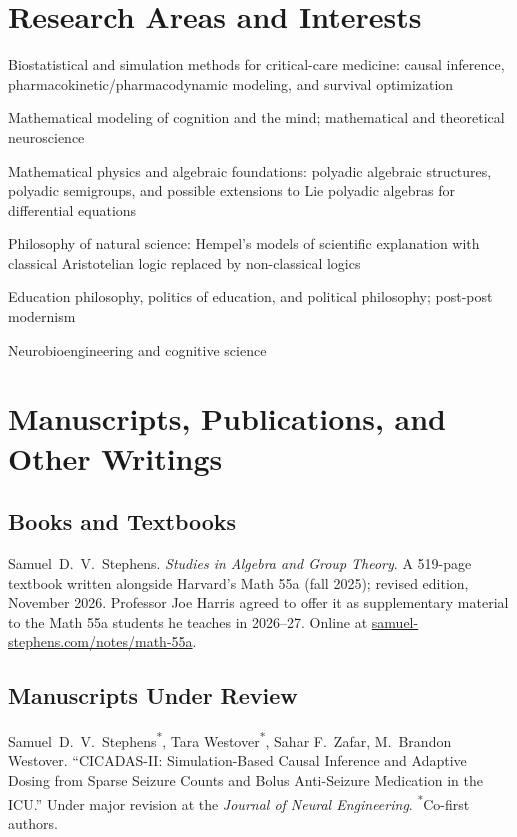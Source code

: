 \documentclass[11pt,letterpaper]{report} %
\newcommand{\listitemspace}{0.25em}
\renewenvironment{itemize}
{\begin{list}{}{\setlength{\leftmargin}{0em}
                \setlength{\parskip}{0em}
                \setlength{\itemsep}{\listitemspace}
                \setlength{\parsep}{\listitemspace}}}
{\end{list}}
\begin{document}
    \section*{Research Areas and Interests}
    \begin{itemize}
        \item Biostatistical and simulation methods for critical-care medicine: causal inference, pharmacokinetic/pharmacodynamic modeling, and survival optimization
        \item Mathematical modeling of cognition and the mind; mathematical and theoretical neuroscience
        \item Mathematical physics and algebraic foundations: polyadic algebraic structures, polyadic semigroups, and possible extensions to Lie polyadic algebras for differential equations
        \item Philosophy of natural science: Hempel's models of scientific explanation with classical Aristotelian logic replaced by non-classical logics
        \item Education philosophy, politics of education, and political philosophy; post-post modernism
        \item Neurobioengineering and cognitive science
    \end{itemize}

    \section*{Manuscripts, Publications, and Other Writings}
    \subsection*{Books and Textbooks}
    \begin{tablist}
        \item[2025--26] \tab{}Samuel~D.~V.\ Stephens. \textit{Studies in Algebra and Group Theory}. A 519-page textbook written alongside Harvard's Math 55a (fall 2025); revised edition, November 2026. Professor Joe Harris agreed to offer it as supplementary material to the Math 55a students he teaches in 2026--27. Online at \href{https://www.samuel-stephens.com/notes/math-55a/}{samuel-stephens.com/notes/math-55a}.
    \end{tablist}

    \subsection*{Manuscripts Under Review}
    \begin{tablist}
        \item[2026] \tab{}Samuel~D.~V.\ Stephens\textsuperscript{*}, Tara Westover\textsuperscript{*}, Sahar F.\ Zafar, M.~Brandon Westover. \enquote{CICADAS-II: Simulation-Based Causal Inference and Adaptive Dosing from Sparse Seizure Counts and Bolus Anti-Seizure Medication in the ICU.} Under major revision at the \textit{Journal of Neural Engineering}. \textsuperscript{*}Co-first authors.
    \end{tablist}
\end{document}
